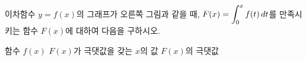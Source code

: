 \noindent\begin{minipage}[t]{0.58\linewidth}\vspace{0pt}\raggedright 이차함수 $y=f(x)$의 그래프가 오른쪽 그림과 같을 때, $F(x)=\displaystyle\int_{0}^{x} f(t)\mkern3mu dt$를 만족시키는 함수 $F(x)$에 대하여 다음을 구하시오.\end{minipage}\hfill\begin{minipage}[t]{0.4\linewidth}\vspace{0pt}\centering \resizebox{\ifdim\width>\linewidth\linewidth\else\width\fi}{!}{}\end{minipage}\par
{} 함수 $f(x)$
 $F(x)$가 극댓값을 갖는 $x$의 값
 $F(x)$의 극댓값
